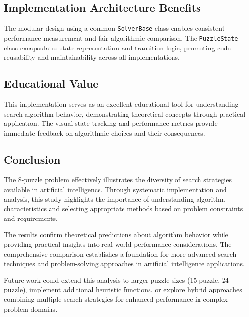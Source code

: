 \documentclass[11pt,a4paper]{article}
\begin{document}
\subsection{Implementation Architecture Benefits}

The modular design using a common \texttt{SolverBase} class enables consistent performance measurement and fair algorithmic comparison. The \texttt{PuzzleState} class encapsulates state representation and transition logic, promoting code reusability and maintainability across all implementations.

\subsection{Educational Value}

This implementation serves as an excellent educational tool for understanding search algorithm behavior, demonstrating theoretical concepts through practical application. The visual state tracking and performance metrics provide immediate feedback on algorithmic choices and their consequences.

\subsection{Conclusion}

The 8-puzzle problem effectively illustrates the diversity of search strategies available in artificial intelligence. Through systematic implementation and analysis, this study highlights the importance of understanding algorithm characteristics and selecting appropriate methods based on problem constraints and requirements.

The results confirm theoretical predictions about algorithm behavior while providing practical insights into real-world performance considerations. The comprehensive comparison establishes a foundation for more advanced search techniques and problem-solving approaches in artificial intelligence applications.

Future work could extend this analysis to larger puzzle sizes (15-puzzle, 24-puzzle), implement additional heuristic functions, or explore hybrid approaches combining multiple search strategies for enhanced performance in complex problem domains.
\end{document}
